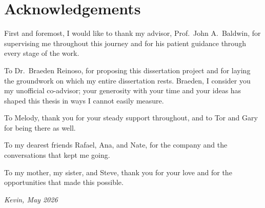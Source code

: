 \chapter*{Acknowledgements}
\label{ch:acknowledgements}

First and foremost, I would like to thank my advisor, Prof.\ John A.\ Baldwin, for supervising me throughout this journey and for his patient guidance through every stage of the work.

To Dr.\ Braeden Reinoso, for proposing this dissertation project and for laying the groundwork on which my entire dissertation rests. Braeden, I consider you my unofficial co-advisor; your generosity with your time and your ideas has shaped this thesis in ways I cannot easily measure.

To Melody, thank you for your steady support throughout, and to Tor and Gary for being there as well.

To my dearest friends Rafael, Ana, and Nate, for the company and the conversations that kept me going.

To my mother, my sister, and Steve, thank you for your love and for the opportunities that made this possible.

\hfill \emph{Kevin, May 2026}
